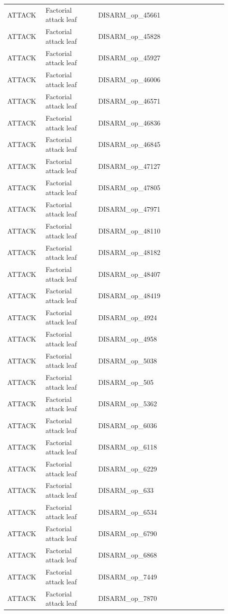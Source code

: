 \begin{table}[htbp]
\begin{threeparttable}
\begin{tabular}{p{0.14\linewidth}p{0.22\linewidth}p{0.54\linewidth}}
ATTACK & Factorial attack leaf & DISARM\_op\_45661 \\
ATTACK & Factorial attack leaf & DISARM\_op\_45828 \\
ATTACK & Factorial attack leaf & DISARM\_op\_45927 \\
ATTACK & Factorial attack leaf & DISARM\_op\_46006 \\
ATTACK & Factorial attack leaf & DISARM\_op\_46571 \\
ATTACK & Factorial attack leaf & DISARM\_op\_46836 \\
ATTACK & Factorial attack leaf & DISARM\_op\_46845 \\
ATTACK & Factorial attack leaf & DISARM\_op\_47127 \\
ATTACK & Factorial attack leaf & DISARM\_op\_47805 \\
ATTACK & Factorial attack leaf & DISARM\_op\_47971 \\
ATTACK & Factorial attack leaf & DISARM\_op\_48110 \\
ATTACK & Factorial attack leaf & DISARM\_op\_48182 \\
ATTACK & Factorial attack leaf & DISARM\_op\_48407 \\
ATTACK & Factorial attack leaf & DISARM\_op\_48419 \\
ATTACK & Factorial attack leaf & DISARM\_op\_4924 \\
ATTACK & Factorial attack leaf & DISARM\_op\_4958 \\
ATTACK & Factorial attack leaf & DISARM\_op\_5038 \\
ATTACK & Factorial attack leaf & DISARM\_op\_505 \\
ATTACK & Factorial attack leaf & DISARM\_op\_5362 \\
ATTACK & Factorial attack leaf & DISARM\_op\_6036 \\
ATTACK & Factorial attack leaf & DISARM\_op\_6118 \\
ATTACK & Factorial attack leaf & DISARM\_op\_6229 \\
ATTACK & Factorial attack leaf & DISARM\_op\_633 \\
ATTACK & Factorial attack leaf & DISARM\_op\_6534 \\
ATTACK & Factorial attack leaf & DISARM\_op\_6790 \\
ATTACK & Factorial attack leaf & DISARM\_op\_6868 \\
ATTACK & Factorial attack leaf & DISARM\_op\_7449 \\
ATTACK & Factorial attack leaf & DISARM\_op\_7870 \\

\end{tabular}
\end{threeparttable}
\end{table}
